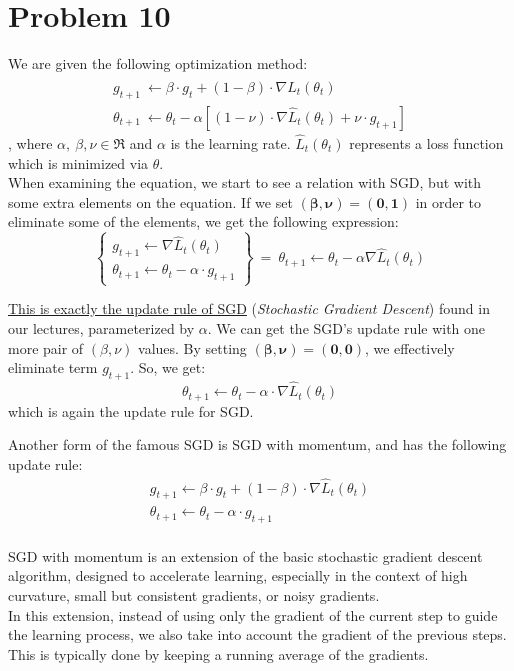 \section{Problem 10}

We are given the following optimization method:
\begin{equation}
\begin{array}{l}{{g_{t+1}\ \leftarrow\beta\cdot g_{t}+(1-\beta)\cdot\nabla \hat{L}_{t}(\theta_{t})}}\\ {{\theta_{t+1}\ \leftarrow\theta_{t}-\alpha\left[(1-\nu)\cdot\nabla\hat{L}_{t}(\theta_{t})+\nu\cdot g_{t+1}\right]}}\end{array}
\label{eq:qhm_equation}
\end{equation}
, where $\alpha,\ \beta, \nu \in \Re$ and $\alpha$ is the learning rate.
$\hat{L}_{t}\left(\theta_{t}\right)$ represents a loss function which is minimized via $\theta$.\\

When examining the equation, we start to see a relation with SGD, but with some extra elements on the equation.
If we set $\mathbf{\left(\beta, \nu\right) = \left(0,1\right)}$ in order to eliminate some of the elements, we get the following expression:
\[
\left\{
\begin{array}{l}
	g_{t+1} \leftarrow \nabla \hat{L}_{t}\left(\theta_{t}\right)\\
	\theta_{t+1}\leftarrow\theta_{t}-\alpha \cdot g_{t+1}
\end{array}
\right\} \ =\  \theta_{t+1} \leftarrow \theta_{t} - \alpha \nabla \hat{L}_{t} \left(\theta_{t}\right)
\]

\underline{This is exactly the update rule of SGD} (\textit{Stochastic Gradient Descent}) found in our lectures, parameterized by $\alpha$.
We can get the SGD's update rule with one more pair of $\left(\beta, \nu  \right)$ values. By setting $\mathbf{\left(\beta, \nu\right) = \left(0,0\right)}$, we effectively eliminate term $g_{t+1}$. So, we get:
\[
\theta_{t+1}\leftarrow\theta_{t}-\alpha\cdot\nabla\hat{L}_{t}(\theta_{t})
\]
which is again the update rule for SGD.

Another form of the famous SGD is SGD with momentum, and has the following update rule:
\[
\begin{array}{l}
	{{g_{t+1}\leftarrow\beta\cdot g_{t}+(1-\beta) \cdot \nabla \hat{L}_{t}(\theta_{t})}}\\ {{\theta_{t+1}\leftarrow\theta_{t}-\alpha\cdot g_{t+1}}}
	\end{array}
\]
\\
SGD with momentum is an extension of the basic stochastic gradient descent algorithm, designed to accelerate learning, especially in the context of high curvature, small but consistent gradients, or noisy gradients. \\
In this extension, instead of using only the gradient of the current step to guide the learning process, we also take into account the gradient of the previous steps. This is typically done by keeping a running average of the gradients.\\

